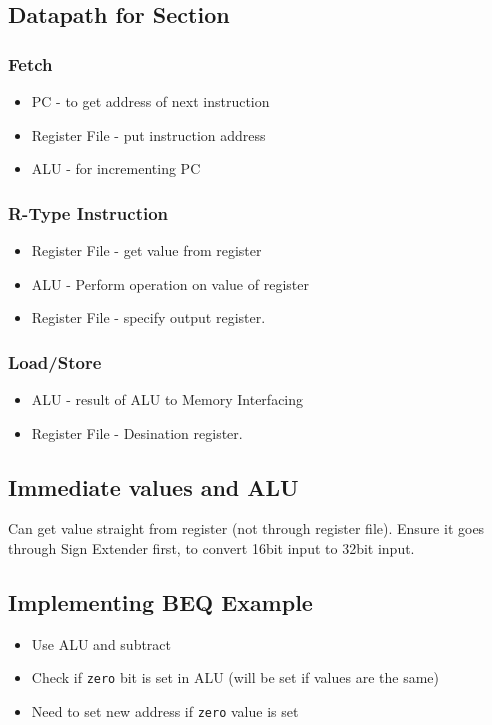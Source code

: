 \documentclass{article}
\begin{document}
	\subsection*{Datapath for Section}
		\subsubsection*{Fetch}
			\begin{itemize}
				\item PC - to get address of next instruction
				\item Register File - put instruction address
				\item ALU - for incrementing PC
			\end{itemize}

		\subsubsection*{R-Type Instruction}
			\begin{itemize}
				\item Register File - get value from register
				\item ALU - Perform operation on value of register
				\item Register File - specify output register.
			\end{itemize}

		\subsubsection*{Load/Store}
			\begin{itemize}
				\item ALU - result of ALU to Memory Interfacing
				\item Register File - Desination register.
			\end{itemize}

	\subsection*{Immediate values and ALU}
		Can get value straight from register (not through register file). Ensure it goes through Sign Extender first, to convert 16bit input to 32bit input.

	\subsection*{Implementing BEQ Example}
		\begin{itemize}
			\item Use ALU and subtract
			\item Check if \texttt{zero} bit is set in ALU (will be set if values are the same)
			\item Need to set new address if \texttt{zero} value is set
		\end{itemize}
\end{document}
